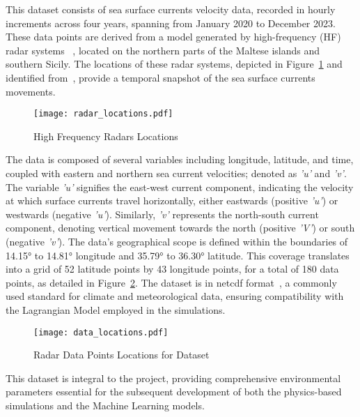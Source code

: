 This dataset consists of sea surface currents velocity data, recorded in hourly increments across four years, spanning from January 2020 to December 2023. These data points are derived from a model generated by high-frequency (HF) radar systems ~\cite{11}, located on the northern parts of the Maltese islands and southern Sicily. The locations of these radar systems, depicted in Figure~\ref{fig_2.1} and identified from~\cite{12}, provide a temporal snapshot of the sea surface currents movements.  

\begin{figure}[htbp]
    \centering
    \texttt{[image: radar\_locations.pdf]}
    \caption[Short sample caption.]{High Frequency Radars Locations\label{fig_2.1}}
\end{figure}

The data is composed of several variables including longitude, latitude, and time, coupled with eastern and northern sea current velocities; denoted as \textit{'u'} and \textit{'v'}. The variable \textit{'u'} signifies the east-west current component, indicating the velocity at which surface currents travel horizontally, either eastwards (positive \textit{'u'}) or westwards (negative \textit{'u'}). Similarly, \textit{'v'} represents the north-south current component, denoting vertical movement towards the north (positive \textit{'V'}) or south (negative \textit{'v'}). The data's geographical scope is defined within the boundaries of 14.15° to 14.81° longitude and 35.79° to 36.30° latitude. This coverage translates into a grid of 52 latitude points by 43 longitude points, for a total of 180 data points, as detailed in Figure~\ref{fig_2.2}. The dataset is in \acrshort{netcdf} format~\cite{13}, a commonly used standard for climate and meteorological data, ensuring compatibility with the Lagrangian Model employed in the simulations.

\begin{figure}[htbp]
    \centering
    \texttt{[image: data\_locations.pdf]}
    \caption[Short sample caption.]{Radar Data Points Locations for Dataset\label{fig_2.2}}
\end{figure}

This dataset is integral to the project, providing comprehensive environmental parameters essential for the subsequent development of both the physics-based simulations and the Machine Learning models.

